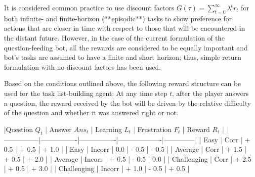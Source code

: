 It is considered common practice to use discount factors $G(\tau) = \sum \limits_{t=0}^\infty \lambda^t r_t $ for both infinite- and finite-horizon (**episodic**) tasks to show preference for actions that are closer in time with respect to those that will be encountered in the distant future.
However, in the case of the current formulation of the question-feeding bot, all the rewards are considered to be equally important and bot's tasks are assumed to have a finite and short horizon;
thus, simple return formulation with no discount factors has been used.

Based on the conditions outlined above, the following reward structure can be used for the task list-building agent:
At any time step $t$, after the player answers a question, the reward received by the bot will be driven by the relative difficulty of the question and whether it was answered right or not.

|Question $Q_t$ | Answer $Ans_t$ | Learning $L_t$ | Frustration $F_t$ | Reward $R_t$ |
|---------------|----------------|----------------|-------------------|--------------|
|     Easy      |      Corr      |      + 0.5     |       + 0.5       |    + 1.0     |
|     Easy      |     Incorr     |        0.0     |       - 0.5       |    - 0.5     |
|    Average    |      Corr      |      + 1.5     |       + 0.5       |    + 2.0     |
|    Average    |     Incorr     |      + 0.5     |       - 0.5       |      0.0     |
|  Challenging  |      Corr      |      + 2.5     |       + 0.5       |    + 3.0     |
|  Challenging  |     Incorr     |      + 1.0     |       - 0.5       |    + 0.5     |
